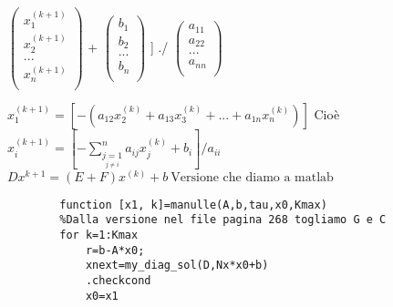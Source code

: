 \documentclass{article} %
\begin{document}
\begin{center}
        \(\begin{pmatrix}
            x_{1}^{(k+1)}\\
            x_{2}^{(k+1)} \\
            ...\\
            x_{n}^{(k+1)} \\
        \end{pmatrix}\)
        +
        \(\begin{pmatrix}
            b_{1}\\
            b_{2} \\
            ...\\
            b_{n} \\
        \end{pmatrix}\)
    ]
    ./
    \(\begin{pmatrix}
        a_{11}\\
        a_{22} \\
        ...\\
        a_{nn} \\
    \end{pmatrix}\)
    \newline

    \(
        x_1^{(k+1)}=[-(
        a_{12}x_2^{(k)} + a_{13}x_3^{(k)} + ... + a_{1n}x_n^{(k)})]
    \)
    Cioè 
    \newline
    \(
        x_i^{(k+1)}=[-
        \sum_{\underset{j\neq i}{j=1} }^{n}a_{ij}x_j^{(k)} + b_i]/a_{ii}
    \)
    \newline
    \(
        Dx^{k+1}=(E+F)x^(k)+b\ \text{Versione che diamo a matlab}
    \)
    

    \begin{lstlisting}
        function [x1, k]=manulle(A,b,tau,x0,Kmax)
        %Dalla versione nel file pagina 268 togliamo G e C
        for k=1:Kmax
            r=b-A*x0;
            xnext=my_diag_sol(D,Nx*x0+b)
            .checkcond
            x0=x1


    \end{lstlisting}
    


\end{center}
\end{document}
